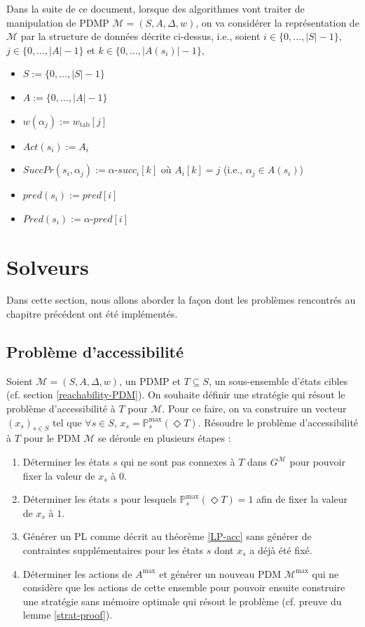 \documentclass[12pt,a4paper]{report}
\theoremstyle{definition}%
\theoremstyle{remark}
\newcommand{\pr}{\mathbb{P}}
\let\labelitemi\labelitemii
\begin{document}
Dans la suite de ce document, lorsque des algorithmes vont traiter de
manipulation de PDMP $\mathcal{M} = (S, A, \Delta, w)$, on va considérer la
représentation de $\mathcal{M}$ par la structure de données décrite ci-dessus, i.e., soient $i \in \{0, \dots, |S| - 1 \}$,
$j \in \{0, \dots, |A| - 1 \}$ et $k \in \{0, \dots, |A(s_i)| - 1 \}$,
\begin{itemize}
	\renewcommand{\labelitemi}{\tiny$\bullet$}
	\item $S := \{0, \dots, |S| - 1 \}$
	\item $A := \{0, \dots, |A| - 1 \}$
	\item $w(\alpha_j) := w_{\text{tab}}[j]$
	\item $Act(s_i) := A_i$
	\item $SuccPr(s_i, \alpha_j) := \alpha$-$succ_i[k]$ où $A_i[k] = j$ (i.e.,
		$\alpha_j \in A(s_i)$)
	\item $pred(s_i) := pred[i]$
	\item $Pred(s_i) := \alpha\text{-}pred[i]$
\end{itemize}


\section{Solveurs}
Dans cette section, nous allons aborder la façon dont les problèmes rencontrés
au chapitre précédent ont été implémentés.
\subsection{Problème d'accessibilité} \label{reach-impl}
Soient $\mathcal{M} = (S, A, \Delta, w)$, un PDMP et $T \subseteq S$, un
sous-ensemble d'états cibles (cf. section \ref{reachability-PDM}).
On souhaite définir une stratégie qui résout le problème d'accessibilité à $T$
pour $\mathcal{M}$.
Pour ce faire, on va construire un vecteur $(x_s)_{s \in S}$
tel que $\forall s \in S$, $x_s = \pr_s^{\max}(\Diamond T)$.
Résoudre le problème d'accessibilité à $T$ pour le PDM $\mathcal{M}$ se déroule
en plusieurs étapes :
\begin{enumerate}
	\item Déterminer les états $s$ qui ne sont pas connexes à $T$ dans
		$G^\mathcal{M}$ pour pouvoir fixer la valeur de $x_s$ à $0$.
	\item Déterminer les états $s$ pour lesquels $\pr^{\max}_s(\Diamond T) = 1$ afin de fixer la valeur de $x_s$ à $1$.
	\item Générer un PL comme décrit au théorème \ref{LP-acc} sans générer
		de contraintes supplémentaires pour les états $s$ dont $x_s$ a déjà été fixé.
	\item Déterminer les actions de $A^{\max}$ et générer un nouveau PDM
		$\mathcal{M}^{\max}$ qui ne considère
		que les actions de cette ensemble pour pouvoir ensuite construire une
		stratégie sans mémoire
		optimale qui résout le problème (cf. preuve du lemme \ref{strat-proof}).
\end{enumerate}
\end{document}
